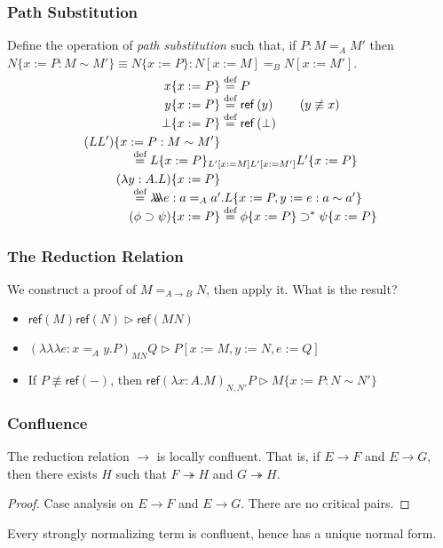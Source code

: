 \documentclass[handout]{beamer}
\newcommand{\eqdef}{\mathrel{\smash{\stackrel{\text{def}}{=}}}}
\newcommand{\reff}[1]{\ensuremath{\mathsf{ref} \left( {#1} \right)}}
\newcommand{\triplelambda}{\ensuremath{\lambda \!\! \lambda \!\! \lambda}}
\begin{document}
\begin{frame}[fragile]
\frametitle{Path Substitution}
Define the operation of \emph{path substitution} such that,
if $P : M =_A M'$ then $N \{ x := P : M \sim M' \} \equiv N \{ x:= P \} : N [x := M ]=_B N [x := M']$.
\begin{align*}
x \{ x := P \} & \eqdef P \\
y \{ x := P \} & \eqdef \reff{y} \qquad (y \not\equiv x) \\
\bot \{ x := P \} & \eqdef \reff{\bot} \\
(LL') \{ x := P : M \sim M' \} \\
\omit\rlap{\qquad \qquad $\eqdef L \{ x := P \}_{L' [x := M] L' [x := M']} L' \{ x := P \}$} \\
(\lambda y:A.L) \{ x := P \} & \\
\omit\rlap{\qquad\qquad $\eqdef \triplelambda e : a =_A a' . L \{ x := P , y := e : a \sim a' \}$} \\
(\phi \supset \psi) \{ x := P \} & \eqdef \phi \{ x := P \} \supset^* \psi \{ x := P \}
\end{align*}
\end{frame}

\begin{frame}[fragile]
\frametitle{The Reduction Relation}
We construct a proof of $M =_{A \rightarrow B} N$, then apply it.  What is the result?
\begin{itemize}
\item
$\reff{M} \reff{N} \rhd \reff{MN}$
\item
$(\triplelambda e:x =_A y. P)_{MN}Q \rhd P[x:=M, y:=N, e:=Q]$
\item
If $P \not\equiv \reff{-}$, then $\reff{\lambda x:A.M}_{N,N'} P \rhd M \{ x := P : N ∼ N' \}$
\end{itemize}
\end{frame}

\begin{frame}[fragile]
\frametitle{Confluence}

\begin{theorem}
The reduction relation $\rightarrow$ is locally confluent.  That is, if $E \rightarrow F$ and $E \rightarrow G$, then there
exists $H$ such that $F \twoheadrightarrow H$ and $G \twoheadrightarrow H$.
\end{theorem}

\begin{proof}
Case analysis on $E \rightarrow F$ and $E \rightarrow G$.  There are no critical pairs.
\end{proof}


\begin{corollary}
Every strongly normalizing term is confluent, hence has a unique normal form.
\end{corollary}
\end{frame}
\end{document}
